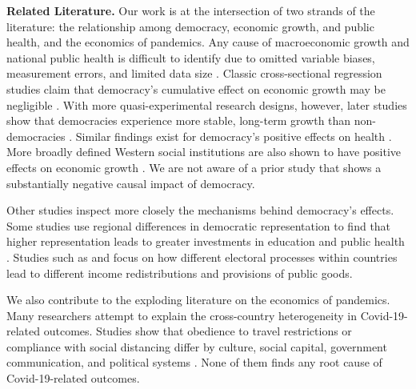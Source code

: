 \textbf{Related Literature.} Our work is at the intersection of two strands of the literature: the relationship among democracy, economic growth, and public health, and the economics of pandemics. Any cause of macroeconomic growth and national public health is difficult to identify due to omitted variable biases, measurement errors, and limited data size \citep{klenow1997economic, helpman2009mystery}. Classic cross-sectional regression studies claim that democracy's cumulative effect on economic growth may be negligible \citep{barroDeterminantsEconomicGrowth1997,przeworskiPoliticalRegimesEconomic,przeworskiDemocracyDevelopmentPolitical2000}. With more quasi-experimental research designs, however, later studies show that democracies experience more stable, long-term growth than non-democracies \citep{acemogluDemocracyDoesCause2018, papaioannouDemocratisationGrowth2008, perssonDemocracyDevelopmentDevil2006, perssonGrowthEffectDemocracy2007, quinnDemocracyNationalEconomic2001, rodrikDemocraticTransitionsProduce2005}. Similar findings exist for democracy's positive effects on health \citep{besleyHealthDemocracy2006a, kudamatsuHasDemocratizationReduced2012}. More broadly defined Western social institutions are also shown to have positive effects on economic growth \citep{acemogluColonialOriginsComparative2001, acemogluReversalFortuneGeography2002, easterlyTropicsGermsCrops2003, hallWhyCountriesProduce1999}. We are not aware of a prior study that shows a substantially negative causal impact of democracy. 


Other studies inspect more closely the mechanisms behind democracy’s effects. Some studies use regional differences in democratic representation to find that higher representation leads to greater investments in education and public health \citep{baumPoliticalEconomyGrowth2003, doucouliagosDemocracyEconomicGrowth2008,baumInvisibleHandDemocracy2001, tavaresHowDemocracyAffects2001}. Studies such as \citet{besleyPoliticalInstitutionsPolicyChoices2003} and \citet{burgessValueDemocracyEvidence2015} focus on how different electoral processes within countries lead to different income redistributions and provisions of public goods.

We also contribute to the exploding literature on the economics of pandemics. Many researchers attempt to explain the cross-country heterogeneity in Covid-19-related outcomes. Studies show that obedience to travel restrictions or compliance with social distancing differ by culture, social capital, government communication, and political systems \citep{freyDemocracyCultureContagion2020, giuliano2020compliance, bilginDemocracyCOVID19Outcomes2021, bosancianu_dionne_hilbig_humphreys_kc_lieber_scacco_2020, Schmelze2016385118}. None of them finds any root cause of Covid-19-related outcomes. 

